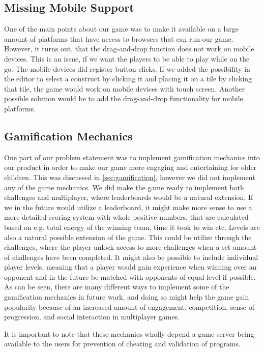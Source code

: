 \subsection{Missing Mobile Support}
One of the main points about our game was to make it available on a large amount of platforms that have access to browsers that can run our game. However, it turns out, that the drag-and-drop function does not work on mobile devices. This is an issue, if we want the players to be able to play while on the go. The mobile devices did register button clicks. If we added the possibility in the editor to select a construct by clicking it and placing it on a tile by clicking that tile, the game would work on mobile devices with touch screen. Another possible solution would be to add the drag-and-drop functionality for mobile platforms.

\subsection{Gamification Mechanics}
One part of our problem statement was to implement gamification mechanics into our product in order to make our game more engaging and entertaining for older children. This was discussed in \autoref{sec:gamification}, however we did not implement any of the game mechanics. We did make the game ready to implement both challenges and multiplayer, where leaderboards would be a natural extension. If we in the future would utilize a leaderboard, it might make more sense to use a more detailed scoring system with whole positive numbers, that are calculated based on e.g. total energy of the winning team, time it took to win etc. Levels are also a natural possible extension of the game. This could be utilize through the challenges, where the player unlock access to more challenges when a set amount of challenges have been completed. It might also be possible to include individual player levels, meaning that a player would gain experience when winning over an opponent and in the future be matched with opponents of equal level if possible.\\

As can be seen, there are many different ways to implement some of the gamification mechanics in future work, and doing so might help the game gain popularity because of an increased amount of engagement, competition, sense of progression, and social interaction in multiplayer games.\newline

It is important to note that these mechanics wholly depend a game server being available to the users for prevention of cheating and validation of programs.

